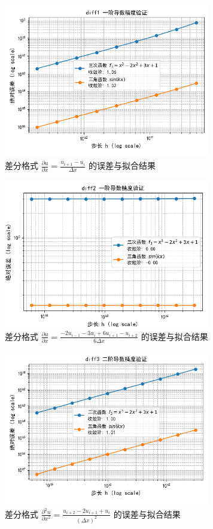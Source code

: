 \documentclass[UTF8]{ctexart}
\begin{document}
\begin{figure}[H]
    \centering
    \includegraphics[width=0.8\textwidth]{f1.png} 
    \caption{差分格式 $\frac{\partial u}{\partial x} = \frac{u_{i+1} - u_i}{\Delta x}$ 的误差与拟合结果}
    \label{fig:result1} 
\end{figure}
\begin{figure}[H]
    \centering
    \includegraphics[width=0.8\textwidth]{f2.png} 
    \caption{差分格式 $\frac{\partial u}{\partial x} = \frac{-2u_{i-1}-3u_i + 6u_{i+1} - u_{i+2}}{6\Delta x}$  的误差与拟合结果}
    \label{fig:result2} 
\end{figure}
\begin{figure}[H]
    \centering
    \includegraphics[width=0.8\textwidth]{f3.png} 
    \caption{差分格式 $\frac{\partial^2 u}{\partial x^2} = \frac{u_{i+2} - 2u_{i+1} + u_i}{(\Delta x)^2}$  的误差与拟合结果}
    \label{fig:result3} 
\end{figure}
\end{document}
